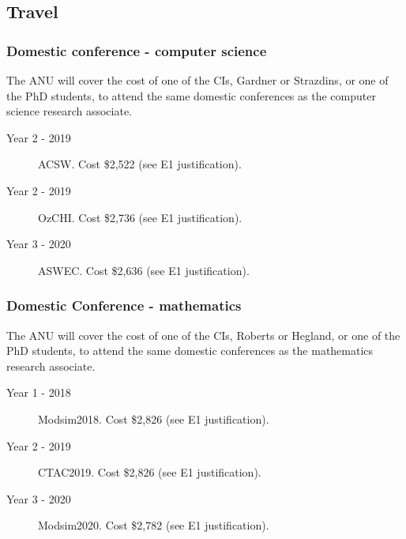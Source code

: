 \documentclass[a4paper,twoside,12pt,compact]{article}
\begin{document}
\subsection*{Travel}

\subsubsection*{Domestic conference - computer science}

The ANU will cover the cost of one of the CIs, Gardner or Strazdins, or one of the PhD students,
to attend the  same domestic conferences as the computer science 
research associate. 


\begin{description}
\item[Year 2 - 2019] ACSW. Cost \$2,522  (see E1 justification).

\item[Year 2 - 2019] OzCHI. Cost \$2,736 (see E1 justification).

\item[Year 3 -  2020] ASWEC.  Cost \$2,636 (see E1 justification).

\end{description}

\subsubsection*{Domestic Conference - mathematics}

The ANU will cover the cost of one of the CIs, Roberts or Hegland, or one of the PhD students,
to attend the  same domestic conferences as the mathematics 
research associate. 


\begin{description}
\item[Year 1 - 2018] Modsim2018. Cost \$2,826  (see E1 justification).

\item[Year 2 - 2019] CTAC2019. Cost \$2,826  (see E1 justification).

\item[Year 3 - 2020] Modsim2020.  Cost \$2,782  (see E1 justification).


\end{description}
\end{document}

